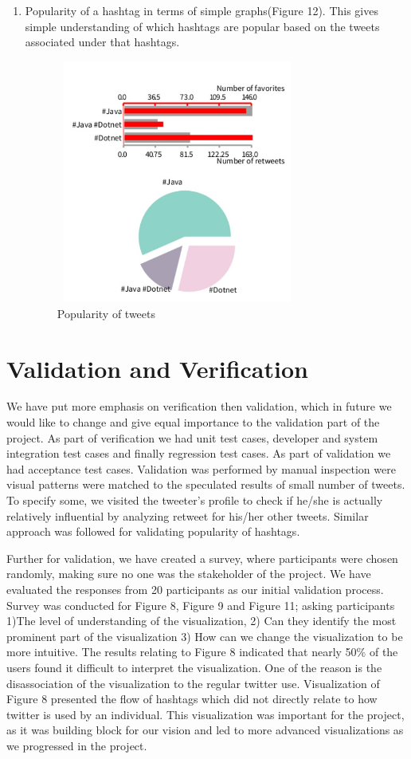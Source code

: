 \documentclass[11pt]{article}
\begin{document}
\begin{enumerate}
\item Popularity of a hashtag in terms of simple graphs(Figure 12). This gives simple understanding of which hashtags are popular based on the tweets associated under that hashtags.
\begin{figure}[h]
\centering
\includegraphics[width=8cm, height=8cm]{Graph.jpg}
\caption{Popularity of tweets}
\end{figure}


\end{enumerate}

\section{Validation and Verification}
We have put more emphasis on verification then validation, which in future we would like to change and give equal importance to the validation part of the project. As part of verification we had unit test cases, developer and system integration test cases and finally regression test cases. As part of validation we had acceptance test cases. Validation was performed by manual inspection were visual patterns were matched to the speculated results of small number of tweets. To specify some, we visited the tweeter's profile to check if he/she is actually relatively influential by analyzing retweet for his/her other tweets. Similar approach was followed for validating popularity of hashtags.

Further for validation, we have created a survey, where participants were chosen randomly, making sure no one was the stakeholder of the project. We have evaluated the responses from 20 participants as our initial validation process. Survey was conducted for Figure 8, Figure 9 and Figure 11; asking participants 1)The level of understanding of the visualization, 2) Can they identify the most prominent part of the visualization 3) How can we change the visualization to be more intuitive. The results relating to Figure 8 indicated that nearly 50\% of the users found it difficult to interpret the visualization. One of the reason is the disassociation of the visualization to the regular twitter use. Visualization of Figure 8 presented the flow of hashtags which did not directly relate to how twitter is used by an individual. This visualization was important for the project, as it was building block for our vision and led to more advanced visualizations as we progressed in the project.
\end{document}
